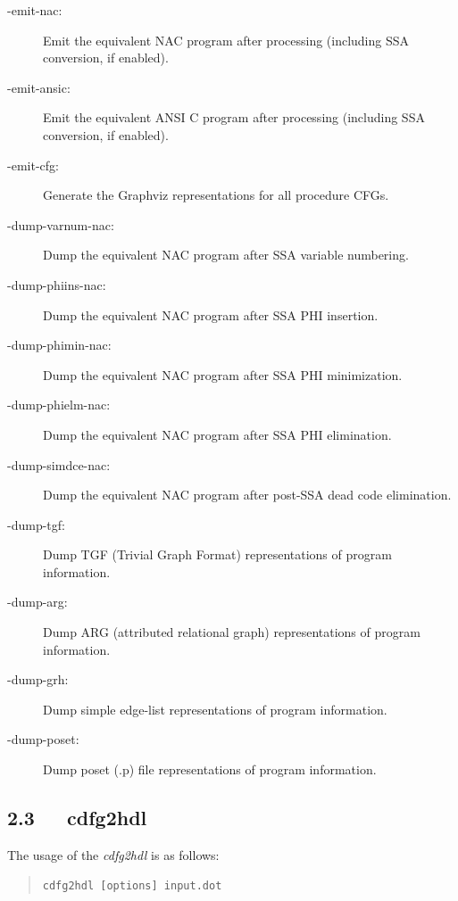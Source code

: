 \documentclass[a4paper]{article}
\providecommand*{\DUroletitlereference}[1]{\textsl{#1}}
\begin{document}
\begin{description}
\item[{-emit-nac:}] \leavevmode 
Emit the equivalent NAC program after processing (including SSA
conversion, if enabled).

\item[{-emit-ansic:}] \leavevmode 
Emit the equivalent ANSI C program after processing (including SSA
conversion, if enabled).

\item[{-emit-cfg:}] \leavevmode 
Generate the Graphviz representations for all procedure CFGs.

\item[{-dump-varnum-nac:}] \leavevmode 
Dump the equivalent NAC program after SSA variable numbering.

\item[{-dump-phiins-nac:}] \leavevmode 
Dump the equivalent NAC program after SSA PHI insertion.

\item[{-dump-phimin-nac:}] \leavevmode 
Dump the equivalent NAC program after SSA PHI minimization.

\item[{-dump-phielm-nac:}] \leavevmode 
Dump the equivalent NAC program after SSA PHI elimination.

\item[{-dump-simdce-nac:}] \leavevmode 
Dump the equivalent NAC program after post-SSA dead code elimination.

\item[{-dump-tgf:}] \leavevmode 
Dump TGF (Trivial Graph Format) representations of program information.

\item[{-dump-arg:}] \leavevmode 
Dump ARG (attributed relational graph) representations of program information.

\item[{-dump-grh:}] \leavevmode 
Dump simple edge-list representations of program information.

\item[{-dump-poset:}] \leavevmode 
Dump poset (.p) file representations of program information.

\end{description}


\subsection{2.3~~~cdfg2hdl%
  \label{cdfg2hdl}%
}

The usage of the \DUroletitlereference{cdfg2hdl} is as follows:
%
\begin{quote}

\texttt{cdfg2hdl {[}options{]} input.dot}

\end{quote}
\end{document}
